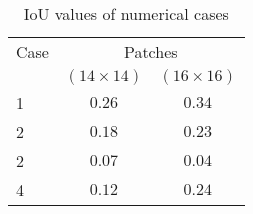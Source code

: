\begin{table}[ht!]
	\centering
	\caption{IoU values of numerical cases}
	\label{tab:table_all_numerical_cases_bounding_boxes}
	{
		\begin{tabular}{lcc}
			\toprule[1.5pt]
			Case & \multicolumn{2}{c}{Patches} \\ 
			\cmidrule(lr){2-3} & \multicolumn{1}{c}{\((14\times14)\)} & \multicolumn{1}{c}{\((16\times16)\)} \\			
			\midrule 
			1 & \(0.26\) & \(0.34\) \\
			2 & \(0.18\) & \(0.23\) \\
			2 & \(0.07\) & \(0.04\) \\
			4 & \(0.12\) & \(0.24\) \\
			\bottomrule[1.5pt]
		\end{tabular}
	}
\end{table}
